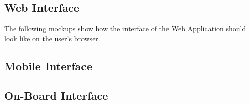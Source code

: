 \subsection{Web Interface}
The following mockups show how the interface of the Web Application should look like on the user's browser.

\subsection{Mobile Interface}

\subsection{On-Board Interface}